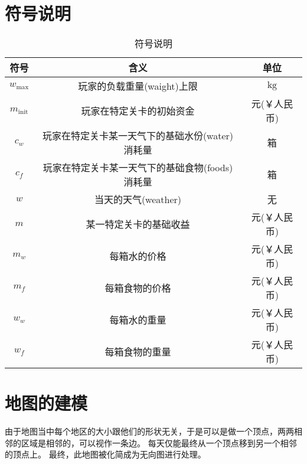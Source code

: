 \documentclass{cumcmthesis}
\begin{document}
\section{符号说明}
\begin{table}[H]
	\caption{符号说明}
	\centering
	\begin{tabular}{ccc}
		\toprule[1.5pt]
		符号                  & 含义                                                           & 单位          \\
		\midrule[1pt]
		$w_{\mathrm{max}}$    & \qquad\qquad\quad 玩家的负载重量(waight)上限\qquad\qquad\qquad & $\mathrm{kg}$ \\
		$ m_{\mathrm{init}} $ & 玩家在特定关卡的初始资金                                       & 元(￥人民币)  \\
		$ c_w $               & 玩家在特定关卡某一天气下的基础水份(water)消耗量                & 箱            \\
		$ c_f $               & 玩家在特定关卡某一天气下的基础食物(foods)消耗量                & 箱            \\
		$ w $                 & 当天的天气(weather)                                            & 无            \\
		$ m $                 & 某一特定关卡的基础收益                                         & 元(￥人民币)  \\
		$ m_w $               & 每箱水的价格                                                   & 元(￥人民币)  \\
		$ m_f $               & 每箱食物的价格                                                 & 元(￥人民币)  \\
		$ w_w $               & 每箱水的重量                                                   & 元(￥人民币)  \\
		$ w_f $               & 每箱食物的重量                                                 & 元(￥人民币)  \\
		\bottomrule[1.5pt]
	\end{tabular}
\end{table}



\newpage
\section{地图的建模}
由于地图当中每个地区的大小跟他们的形状无关，于是可以是做一个顶点，两两相邻的区域是相邻的，可以视作一条边。
每天仅能最终从一个顶点移到另一个相邻的顶点上。
最终，此地图被化简成为无向图进行处理。\par
\end{document}
